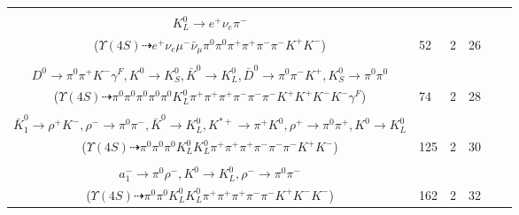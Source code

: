 \documentclass[landscape]{article}
\newcounter{rownumbers}
\newcommand\rn{\stepcounter{rownumbers}\arabic{rownumbers}}
\newcommand{\EOLP}{\\ \hline} %
\newcommand{\topoTags}[1]{#1} %
\begin{document}
\begin{longtable}{clcccc}
\rn & \makecell[l]{ $ 
\Upsilon(4S) \rightarrow B^{0} \bar{B}^{0} ,
B^{0} \rightarrow K^{-} K_{0}^{*+} ,
\bar{B}^{0} \rightarrow \mu^{-} \bar{\nu}_{\mu} D^{*+} ,
K_{0}^{*+} \rightarrow \pi^{0} K^{+} ,
D^{*+} \rightarrow \pi^{+} D^{0} ,
D^{0} \rightarrow \pi^{0} K_{L}^{0} \pi^{+} \pi^{-} ,
$ \\ $
K_{L}^{0} \rightarrow e^{+} \nu_{e} \pi^{-} 
$ \\ ($
\Upsilon(4S) \dashrightarrow e^{+} \nu_{e} \mu^{-} \bar{\nu}_{\mu} \pi^{0} \pi^{0} \pi^{+} \pi^{+} \pi^{-} \pi^{-} K^{+} K^{-} 
$) } & \topoTags{52 & }2 & 26 \EOLP

\rn & \makecell[l]{ $ 
\Upsilon(4S) \rightarrow B^{0} \bar{B}^{0} ,
B^{0} \rightarrow \pi^{+} K^{+} K^{-} K^{*+} K^{*-} D^{*-} ,
\bar{B}^{0} \rightarrow \pi^{0} D^{0} ,
K^{*+} \rightarrow \pi^{+} K^{0} ,
K^{*-} \rightarrow \pi^{-} \bar{K}^{0} ,
D^{*-} \rightarrow \pi^{-} \bar{D}^{0} ,
$ \\ $
D^{0} \rightarrow \pi^{0} \pi^{+} K^{-} \gamma^{F} ,
K^{0} \rightarrow K_{S}^{0} ,
\bar{K}^{0} \rightarrow K_{L}^{0} ,
\bar{D}^{0} \rightarrow \pi^{0} \pi^{-} K^{+} ,
K_{S}^{0} \rightarrow \pi^{0} \pi^{0} 
$ \\ ($
\Upsilon(4S) \dashrightarrow \pi^{0} \pi^{0} \pi^{0} \pi^{0} \pi^{0} K_{L}^{0} \pi^{+} \pi^{+} \pi^{+} \pi^{-} \pi^{-} \pi^{-} K^{+} K^{+} K^{-} K^{-} \gamma^{F} 
$) } & \topoTags{74 & }2 & 28 \EOLP

\rn & \makecell[l]{ $ 
\Upsilon(4S) \rightarrow B^{0} \bar{B}^{0} ,
B^{0} \rightarrow \rho^{+} D^{-} ,
\bar{B}^{0} \rightarrow J/\psi \bar{K}_1^{0} ,
\rho^{+} \rightarrow \pi^{0} \pi^{+} ,
D^{-} \rightarrow \pi^{-} \rho^{-} K^{+} ,
J/\psi \rightarrow \pi^{-} \bar{K}^{0} K^{*+} ,
$ \\ $
\bar{K}_1^{0} \rightarrow \rho^{+} K^{-} ,
\rho^{-} \rightarrow \pi^{0} \pi^{-} ,
\bar{K}^{0} \rightarrow K_{L}^{0} ,
K^{*+} \rightarrow \pi^{+} K^{0} ,
\rho^{+} \rightarrow \pi^{0} \pi^{+} ,
K^{0} \rightarrow K_{L}^{0} 
$ \\ ($
\Upsilon(4S) \dashrightarrow \pi^{0} \pi^{0} \pi^{0} K_{L}^{0} K_{L}^{0} \pi^{+} \pi^{+} \pi^{+} \pi^{-} \pi^{-} \pi^{-} K^{+} K^{-} 
$) } & \topoTags{125 & }2 & 30 \EOLP

\rn & \makecell[l]{ $ 
\Upsilon(4S) \rightarrow B^{0} \bar{B}^{0} ,
B^{0} \rightarrow K^{*} \eta_{c}(2S) ,
\bar{B}^{0} \rightarrow D^{+} a_{1}^{-} ,
K^{*} \rightarrow \pi^{-} K^{+} ,
\eta_{c}(2S) \rightarrow \pi^{+} K^{0} K^{-} ,
D^{+} \rightarrow K_{L}^{0} \pi^{+} \pi^{+} K^{-} ,
$ \\ $
a_{1}^{-} \rightarrow \pi^{0} \rho^{-} ,
K^{0} \rightarrow K_{L}^{0} ,
\rho^{-} \rightarrow \pi^{0} \pi^{-} 
$ \\ ($
\Upsilon(4S) \dashrightarrow \pi^{0} \pi^{0} K_{L}^{0} K_{L}^{0} \pi^{+} \pi^{+} \pi^{+} \pi^{-} \pi^{-} K^{+} K^{-} K^{-} 
$) } & \topoTags{162 & }2 & 32 \EOLP


\end{longtable}
\end{document}
